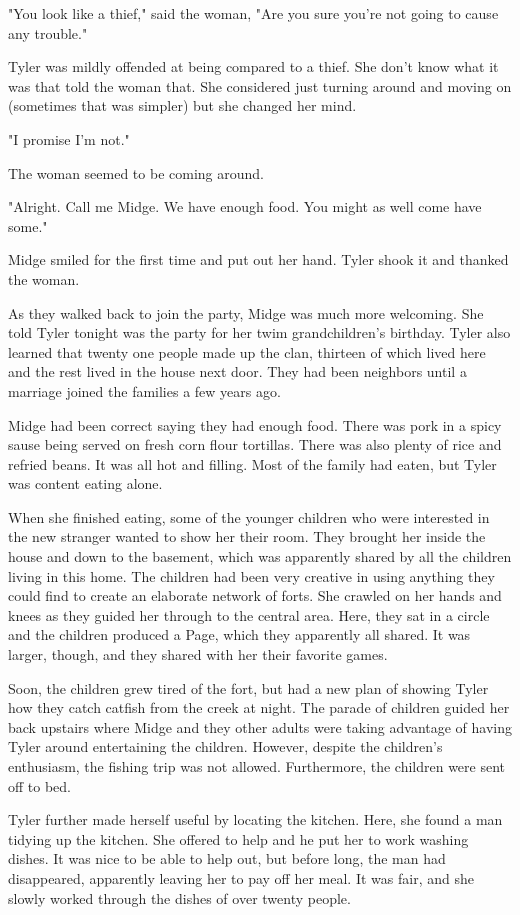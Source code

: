 \documentclass[courier]{sffms}
\begin{document}
"You look like a thief," said the woman, "Are you sure you're
not going to cause any trouble."

Tyler was mildly offended at being compared to a thief. She
don't know what it was that told the woman that. She
considered just turning around and moving on (sometimes
that was simpler) but she changed her mind.

"I promise I'm not."

The woman seemed to be coming around.

"Alright. Call me Midge. We have enough food. You might as
well come have some."

Midge smiled for the first time and put out her hand. Tyler
shook it and thanked the woman.

As they walked back to join the party, Midge was much more
welcoming. She told Tyler tonight was the party for her
twim grandchildren's birthday. Tyler also learned that twenty
one people made up the clan, thirteen of which lived here and
the rest lived in the house next door. They had been neighbors
until a marriage joined the families a few years ago.

Midge had been correct saying they had enough food. There was
pork in a spicy sause being served on fresh corn flour tortillas.
There was also plenty of rice and refried beans. It was all
hot and filling. Most of the family had eaten, but Tyler was content
eating alone.

When she finished eating, some of the younger children who were
interested in the new stranger wanted to show her their room.
They brought her inside the house and down to the basement,
which was apparently shared by all the children living in this home.
The children had been very creative in using anything they could
find to create an elaborate network of forts. She crawled on
her hands and knees as they guided her through to the central
area. Here, they sat in a circle and the children produced a Page,
which they apparently all shared. It was larger, though, and they
shared with her their favorite games.

Soon, the children grew tired of the fort, but had a new plan of
showing Tyler how they catch catfish from the creek at night.
The parade of children guided her back upstairs where Midge and
they other adults were taking advantage of having Tyler around
entertaining the children. However, despite the children's
enthusiasm, the fishing trip was not allowed. Furthermore,
the children were sent off to bed.

Tyler further made herself useful by locating the kitchen. Here, she
found a man tidying up the kitchen. She offered to help and
he put her to work washing dishes. It was nice to be able to help
out, but before long, the man had disappeared, apparently leaving
her to pay off her meal. It was fair, and she slowly worked through
the dishes of over twenty people.
\end{document}
